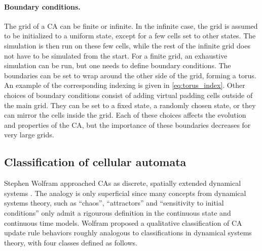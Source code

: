 \paragraph{Boundary conditions.}
The grid of a \ac{CA} can be finite or infinite. In the infinite case, the grid
is assumed to be initialized to a uniform state, except for a few cells set to
other states. The simulation is then run on these few cells, while the rest of
the infinite grid does not have to be simulated from the start. For a finite
grid, an exhaustive simulation can be run, but one needs to define
boundary conditions. The boundaries can be set to wrap around the other side of the
grid, forming a torus. An example of the corresponding indexing is given in
\eqref{eq:torus_index}. Other choices of boundary conditions consist of adding
virtual padding cells outside of the main grid. They can be set to a fixed
state, a randomly chosen state, or they can mirror the cells inside the grid.
Each of these choices affects the evolution and properties of the \ac{CA}, but
the importance of these boundaries decreases for very large grids.

\subsection{Classification of cellular automata\label{sec:class-cell-autom}}

Stephen Wolfram approached \acp{CA} as discrete, spatially extended dynamical
systems \parencite{wolframUniversalityComplexityCellular1984}. The analogy is
only superficial since many concepts from dynamical systems theory, such as
``chaos'', ``attractors'' and ``sensitivity to initial conditions'' only admit a
rigourous definition in the continuous state and continuous time models. Wolfram
proposed a qualitative classification of \ac{CA} update rule behaviors roughly analogous to
classifications in dynamical systems theory, with four classes defined as
follows.


